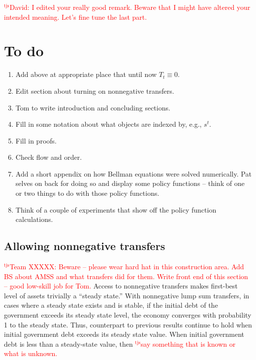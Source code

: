 \documentclass[12pt]{article}
\newcommand{\tjs}[1]{\textcolor{red}{$^{\textrm{tjs}}${#1}}}
\begin{document}
\tjs{David: I edited your really good remark. Beware that I might have altered your intended meaning. Let's fine tune the last part.  }



\section{To do}

\begin{enumerate}
\item Add above at appropriate place that until now $T_t \equiv 0$.
\item  Edit  section about turning on nonnegative transfers.
\item Tom to write introduction and concluding sections.
\item Fill in some notation about what objects are indexed by, e.g., $s^t$.
\item Fill in proofs.
\item Check flow and order.
\item Add a short appendix on how Bellman equations were solved numerically. Pat selves on back for doing so and display
some policy functions -- think of one or two things to do with those policy functions.
\item Think of a couple of experiments that show off the policy function calculations.
\end{enumerate}


\subsection{Allowing nonnegative transfers}
\tjs{Team XXXXX: Beware -- please wear hard hat in this construction area.  Add BS about AMSS and what transfers did for them. Write front end of this section -- good low-skill job for Tom.}
	 Access to nonnegative transfers makes first-best level of assets trivially a ``steady state.''  	
With nonnegative lump sum transfers,  in cases where a steady state exists and is stable,  if the initial debt of the government exceeds its steady state level,  the economy  converges with probability 1 to the steady state. Thus, counterpart to previous  results continue to hold  when
initial government debt exceeds its steady state value.  When initial government debt is less than a steady-state value, then
\tjs{say something that is known or what is unknown.}
\end{document}
